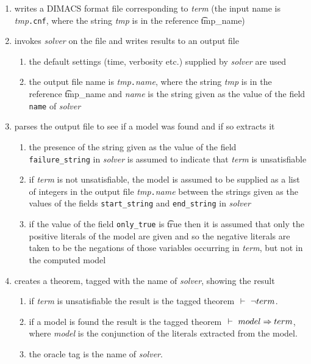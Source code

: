 \begin{enumerate}
\item writes a DIMACS format file corresponding to {\it term} (the input name is {\it tmp}{\tt{.cnf}}, where the string {\it tmp} is in the reference \t{tmp\_name})

\item invokes {\it solver} on the file and writes results to an output file

\begin{enumerate}
\item the default settings (time, verbosity etc.) supplied by {\it solver}
are used
\item the output file name is {\it tmp}{\tt{.}}{\it{name}}, where
the string {\it tmp} is in the reference \t{tmp\_name}
and {\it name} is the string given as the value of the field {\tt name} of {\it solver}
\end{enumerate}

\item parses the output file to see if a model was found and if so extracts it

\begin{enumerate}
\item the presence of the string given as the value of the
field \\ {\tt failure\_string} in {\it solver} is
assumed to indicate that {\it term} is unsatisfiable
\item if {\it term} is not unsatisfiable,
the model is assumed to be supplied as a list of integers in the output file 
{\it tmp}{\tt{.}}{\it{name}} between the strings
given as the values of the fields {\tt start\_string} and {\tt end\_string}
in {\it solver}
\item if the value of the field {\tt only\_true} is
\t{true} then it is assumed that only the positive literals
of the model are given and so
the negative literals are taken to be the negations of those variables
occurring in {\it term}, but not in the computed model
\end{enumerate}


\item creates a theorem, tagged with the name of {\it solver}, showing the result

\begin{enumerate}

\item if {\it term} is unsatisfiable the result is the tagged theorem $\ \vdash\  \neg term$.
\item if a model is found the result is the tagged theorem $\ \vdash\  model \Rightarrow term$,
where {\it model} is the conjunction of the literals extracted from the model.
\item the oracle tag is the name of {\it solver}.
\end{enumerate}
\end{enumerate}

